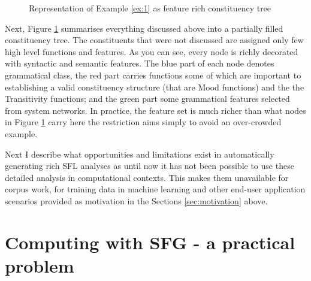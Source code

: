 \begin{figure}[!ht]
    \caption{Representation of Example \ref{ex:1} as feature rich constituency tree}
    \label{fig:mcg-graph-example}
\end{figure}


Next, Figure \ref{fig:mcg-graph-example} summarises everything discussed above into a partially filled constituency tree. The constituents that were not discussed are assigned only few high level functions and features. As you can see, every node is richly decorated with syntactic and semantic features. The blue part of each node denotes grammatical class, the red part carries functions some of  which are important to establishing a valid constituency structure (that are Mood functions) and the the Transitivity functions; and the green part some grammatical features selected from system networks. In practice, the feature set is much richer than what nodes in Figure \ref{fig:mcg-graph-example} carry here the restriction aims simply to avoid an over-crowded example. 



Next I describe what opportunities and limitations exist in automatically generating rich SFL analyses as until now it has not been possible to use these detailed analysis in computational contexts. This makes them unavailable for corpus work, for training data in machine learning and other end-user application scenarios provided as motivation in the Sections \ref{sec:motivation} above.

\section{Computing with SFG - a practical problem}
\label{sec:problem}


